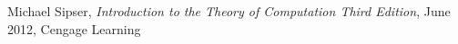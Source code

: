 \newpage
\begin{thebibliography}{999}

	Michael Sipser, \textit{Introduction to the Theory of Computation Third Edition}, June 2012, Cengage Learning
\end{thebibliography}
